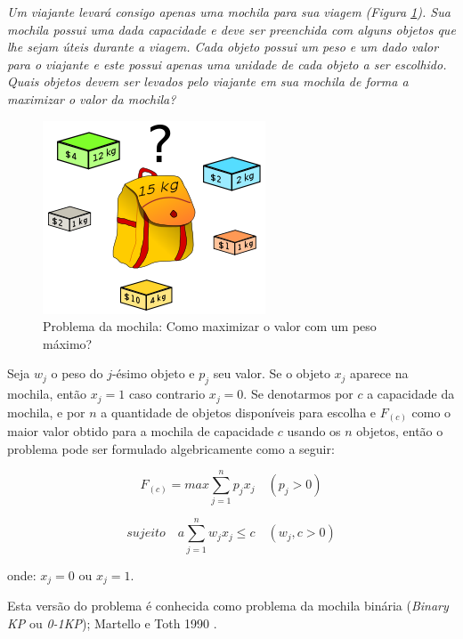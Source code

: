 \textit{Um viajante levará consigo apenas uma mochila para sua viagem (Figura \ref{fig:kp-sample}). Sua mochila possui uma dada capacidade e deve ser preenchida com alguns objetos que lhe sejam úteis durante a viagem. Cada objeto possui um peso e um dado valor para o viajante e este possui apenas uma unidade de cada objeto a ser escolhido. Quais objetos devem ser levados pelo viajante em sua mochila de forma a maximizar o valor da mochila?}

\begin{figure}[h]
	\caption{\label{fig:kp-sample}Problema da mochila: Como maximizar o valor com um peso máximo?}
	\begin{center}
	    \includegraphics[scale=0.5]{imagens/kp-sample.png}
	\end{center}
\end{figure}

Seja $w_j$ o peso do $j$-ésimo objeto e $p_j$ seu valor. Se o objeto $x_j$ aparece na mochila, então  $x_j=1$ caso contrario $x_j=0$. Se denotarmos por $c$ a capacidade da mochila, e por $n$ a quantidade de objetos disponíveis para escolha e $F_(c)$ como o maior valor obtido para a mochila de capacidade $c$ usando os $n$ objetos, então o problema pode ser formulado algebricamente como a seguir:

\begin{equation} \label{eq:taco-ret} 
F_{(c)} = max\sum_{j=1}^{n} p_{j}x_{j} \quad (p_{j} > 0 )
\end{equation}

\begin{equation} \label{eq:taco-ret} 
sujeito \quad a\sum_{j=1}^{n} w_{j}x_{j} \leq c \quad (w_{j},c > 0 )
\end{equation}

onde: $x_j=0$ ou $x_{j}=1$.

Esta versão do problema é conhecida como problema da mochila binária (\textit{Binary KP} ou \textit{0-1KP}); Martello e Toth 1990 \cite{Martello:1990:KPA:98124}.

